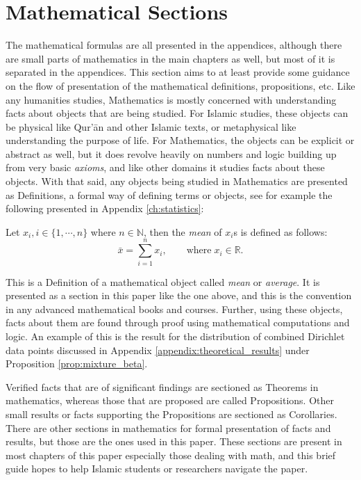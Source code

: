 \section{Mathematical Sections}
The mathematical formulas are all presented in the appendices, although there are small parts of mathematics in the main chapters as well, but most of it is separated in the appendices. This section aims to at least provide some guidance on the flow of presentation of the mathematical definitions, propositions, etc. Like any humanities studies, Mathematics is mostly concerned with understanding facts about objects that are being studied. For Islamic studies, these objects can be physical like Qur'\=an and other Islamic texts, or metaphysical like understanding the purpose of life. For Mathematics, the objects can be explicit or abstract as well, but it does revolve heavily on numbers and logic building up from very basic \textit{axioms}, and like other domains it studies facts about these objects. With that said, any objects being studied in Mathematics are presented as Definitions, a formal way of defining terms or objects, see for example the following presented in Appendix \ref{ch:statistics}:
\begin{defn}[Mean]\label{defn:mean-1}
Let $x_i, i\in\{1,\cdots,n\}$ where $n\in\mathbb{N}$, then the \textit{mean} of $x_i$s is defined as follows:
\begin{equation}\label{eq:mean-formula-1}
    \bar{x} = \sum_{i=1}^n x_i, \qquad\text{where}\;x_i \in\mathbb{R}.
\end{equation}
\end{defn}
This is a Definition of a mathematical object called \textit{mean} or \textit{average}. It is presented as a section in this paper like the one above, and this is the convention in any advanced mathematical books and courses. Further, using these objects, facts about them are found through proof using mathematical computations and logic. An example of this is the result for the distribution of combined Dirichlet data points discussed in Appendix \ref{appendix:theoretical_results} under Proposition \ref{prop:mixture_beta}.

Verified facts that are of significant findings are sectioned as Theorems in mathematics, whereas those that are proposed are called Propositions. Other small results or facts supporting the Propositions are sectioned as Corollaries. There are other sections in mathematics for formal presentation of facts and results, but those are the ones used in this paper. These sections are present in most chapters of this paper especially those dealing with math, and this brief guide hopes to help Islamic students or researchers navigate the paper.